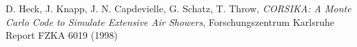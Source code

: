 \documentclass[a4paper,11pt]{article}
\begin{document}
\begin{thebibliography}{99}
   D. Heck, J. Knapp, J. N. Capdevielle, G. Schatz, T. Throw, \textit{CORSIKA: A Monte Carlo Code to Simulate Extensive Air Showers}, Forschungszentrum Karlsruhe Report FZKA 6019 (1998)









\end{thebibliography}
\end{document}

